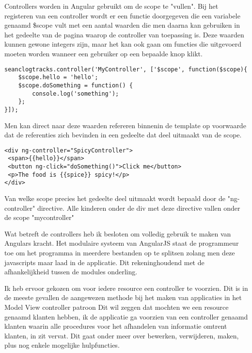 \documentclass[a4paper,11pt]{article}
\begin{document}
Controllers worden in Angular gebruikt om de scope te "vullen". Bij het registeren van een controller wordt er een functie doorgegeven die een variabele genaamd \$scope vult met een aantal waarden die men daarna kan gebruiken in het gedeelte van de pagina waarop de controller van toepassing is. Deze waarden kunnen gewone integers zijn, maar het kan ook gaan om functies die uitgevoerd moeten worden wanneer een gebruiker op een bepaalde knop klikt.
\begin{lstlisting}
seanclogtracks.controller('MyController', ['$scope', function($scope){
	$scope.hello = 'hello';
	$scope.doSomething = function() {
		console.log('something');
	};
}]);
\end{lstlisting}
Men kan direct naar deze waarden refereren binnenin de template op voorwaarde dat de referenties zich bevinden in een gedeelte dat deel uitmaakt van de scope.
\begin{lstlisting}
<div ng-controller="SpicyController">
 <span>{{hello}}</span>
 <button ng-click="doSomething()">Click me</button>
 <p>The food is {{spice}} spicy!</p>
</div>
\end{lstlisting}
Van welke scope precies het gedeelte deel uitmaakt wordt bepaald door de "ng-controller" directive. Alle kinderen onder de div met deze directive vallen onder de scope "mycontroller"

Wat betreft de controllers heb ik besloten om volledig gebruik te maken van Angulars kracht. Het modulaire systeem van AngularJS staat de programmeur toe om het programma in meerdere bestanden op te splitsen zolang men deze javascripts maar laad in de applicatie. Dit rekeninghoudend met de afhankelijkheid tussen de modules onderling.

Ik heb ervoor gekozen om voor iedere resource een controller te voorzien. Dit is in de meeste gevallen de aangewezen methode bij het maken van applicaties in het Model View controller patroon %
Dit wil zeggen dat mochten we een resource genaamd klanten hebben, ik de applicatie ga voorzien van een controller genaamd klanten waarin alle procedures voor het afhandelen van informatie omtrent klanten, in zit vervat.  Dit gaat onder meer over bewerken, verwijderen, maken, plus nog enkele mogelijke hulpfuncties.
\end{document}
